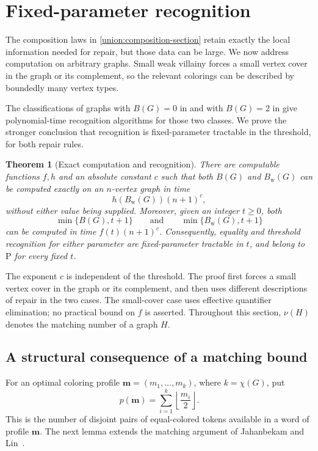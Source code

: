 \documentclass[11pt,reqno]{amsart}
\numberwithin{equation}{section}
\newtheorem{theorem}{Theorem}[section]
\theoremstyle{definition}
\theoremstyle{remark}
\begin{document}

\section{Fixed-parameter recognition}\label{rec:section}

The composition laws in \cref{union:composition-section} retain exactly
the local information needed for repair, but those data can be large.
We now address computation on arbitrary graphs. Small weak villainy
forces a small vertex cover in the graph or its complement, so the
relevant colorings can be described by boundedly many vertex types.

The classifications of graphs with $B(G)=0$ in
\cite{clark2006} and with $B(G)=2$ in \cite{jahanbekam2021}
give polynomial-time recognition algorithms for those two classes.
We prove the stronger conclusion that recognition is fixed-parameter
tractable in the threshold, for both repair rules.

\begin{theorem}[Exact computation and recognition]\label{rec:main}
\label{rec:exact-parameter}
There are computable functions $f,h$ and an absolute constant $c$
such that both $B(G)$ and $B_{\mathrm w}(G)$ can be computed exactly
on an $n$-vertex graph in time
\[
 h(B_{\mathrm w}(G))(n+1)^c,
\]
without either value being supplied. Moreover, given an integer
$t\geq0$, both
\[
\min\{B(G),t+1\}\qquad\text{and}\qquad
\min\{B_{\mathrm w}(G),t+1\}
\]
can be computed in time $f(t)(n+1)^c$.
Consequently, equality and threshold recognition for either parameter
are fixed-parameter tractable in $t$, and belong to $\mathrm P$
for every fixed $t$.
\end{theorem}

The exponent $c$ is independent of the threshold. The proof first forces
a small vertex cover in the graph or its complement, and then uses
different descriptions of repair in the two cases. The small-cover
case uses effective quantifier elimination; no practical bound on
$f$ is asserted. Throughout this section,
$\nu(H)$ denotes the matching number of a graph $H$.

\subsection{A structural consequence of a matching bound}

For an optimal coloring profile $\mathbf m=(m_1,\ldots,m_k)$, where
$k=\chi(G)$, put
\[
p(\mathbf m)=\sum_{i=1}^k\left\lfloor\frac{m_i}{2}\right\rfloor.
\]
This is the number of disjoint pairs of equal-colored tokens available
in a word of profile $\mathbf m$. The next lemma extends the matching
argument of Jahanbekam and Lin~\cite[Lemma~8]{jahanbekam2021}.
\end{document}
